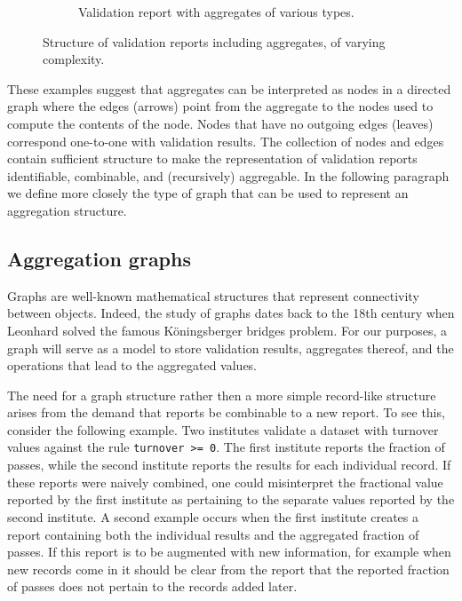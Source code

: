 \documentclass[a4paper, 11pt,titlepage]{article}
\newcommand{\code}[1]{\texttt{#1}}
\begin{document}
\begin{figure}[!t]
\begin{subfigure}[b]{0.7\textwidth}
    \caption{Validation report with aggregates of various types.}
    \label{fig:graph3}
  \end{subfigure}
  \caption{Structure of validation reports including aggregates, of varying complexity.}
  \label{fig:graphs}
\end{figure}

These examples suggest that aggregates can be interpreted as nodes in a
directed graph where the edges (arrows) point from the aggregate to the nodes
used to compute the contents of the node. Nodes that have no outgoing edges
(leaves) correspond one-to-one with validation results.  The collection of
nodes and edges contain sufficient structure to make the representation of
validation reports identifiable, combinable, and (recursively) aggregable. In
the following paragraph we define more closely the type of graph that can be
used to represent an aggregation structure.


\subsection{Aggregation graphs}
\label{sect:aggregationgraphs}
Graphs are well-known mathematical structures that represent connectivity
between objects. Indeed, the  study of graphs dates back to the 18th century
when Leonhard \citet{euler1741solutio} solved the famous K\"oningsberger
bridges problem.  For our purposes, a graph will serve as a model to store
validation results, aggregates thereof, and the operations that lead to the
aggregated values.

The need for a graph structure rather then a more simple record-like structure
arises from the demand that reports be combinable to a new report.  To see
this, consider the following example. Two institutes validate a dataset with
turnover values against the rule \code{turnover >= 0}. The first institute
reports the fraction of passes, while the second institute reports the results
for each individual record. If these reports were naively combined, one could
misinterpret the fractional value reported by the first institute as pertaining
to the separate values reported by the second institute. A second example
occurs when the first institute creates a report containing both the individual
results and the aggregated fraction of passes. If this report is to be
augmented with new information, for example when new records come in it should
be clear from the report that the reported fraction of passes does not pertain
to the records added later.
\end{document}
